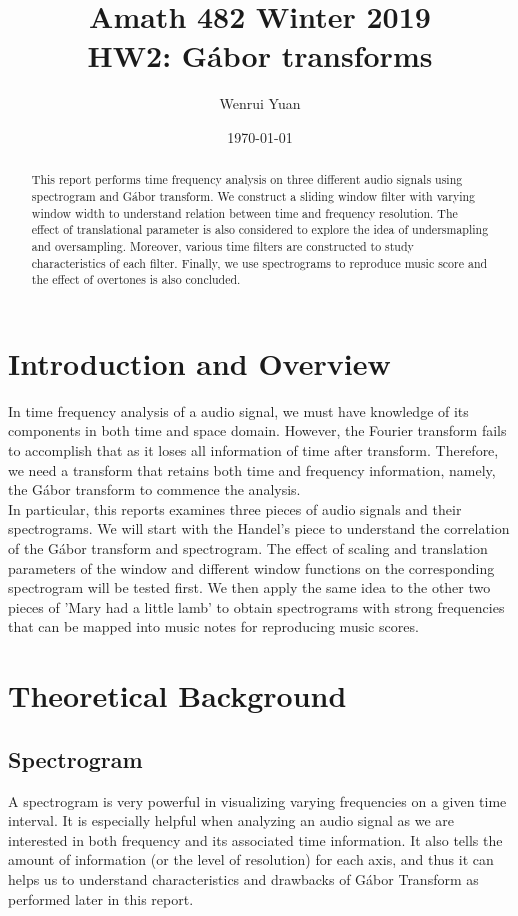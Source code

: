 \documentclass[10pt,a4paper]{article}
\title{Amath 482 Winter 2019 \\
HW2: G\'abor transforms}
\author{Wenrui Yuan}
\date{\today}
\numberwithin{equation}{subsection}
\begin{document}
\maketitle

\begin{abstract}
	This report performs time frequency analysis on three different audio signals using spectrogram and G\'abor transform. We construct a sliding window filter with varying window width to understand relation between time and frequency resolution. The effect of translational parameter is also considered to explore the idea of undersmapling and oversampling. Moreover, various time filters are constructed to study characteristics of each filter. Finally, we use spectrograms to reproduce music score and the effect of overtones is also concluded.
\end{abstract}


\section{Introduction and Overview}
	In time frequency analysis of a audio signal, we must have knowledge of its components in both time and space domain. However, the Fourier transform fails to accomplish that as it loses all information of time after transform. Therefore, we need a transform that retains both time and frequency information, namely, the G\'abor transform to commence the analysis.\\
	In particular, this reports examines three pieces of audio signals and their spectrograms. We will start with the Handel's piece to understand the correlation of the G\'abor transform and spectrogram. The effect of scaling and translation parameters of the window and different window functions on the corresponding spectrogram will be tested first. We then apply the same idea to the other two pieces of 'Mary had a little lamb' to obtain spectrograms with strong frequencies that can be mapped into music notes for reproducing music scores.


\section{Theoretical Background}
\subsection{Spectrogram}
A spectrogram is very powerful in visualizing varying frequencies on a given time interval. It is especially helpful when analyzing an audio signal as we are interested in both frequency and its associated time information. It also tells the amount of information (or the level of resolution) for each axis, and thus it can helps us to understand characteristics and drawbacks of G\'abor Transform as performed later in this report.
\end{document}
